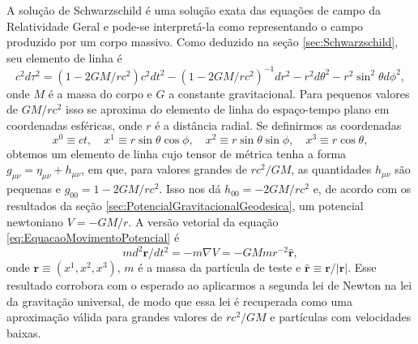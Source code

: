 A solução de Schwarzschild é uma solução exata das equações de campo da Relatividade Geral e pode-se interpretá-la como representando o campo produzido por um corpo massivo. Como deduzido na seção \ref{sec:Schwarzschild}, seu elemento de linha é
\[c^{2} d \tau^{2}=\left(1-2 G M / r c^{2}\right) c^{2} d t^{2}-\left(1-2 G M / r c^{2}\right)^{-1} d r^{2}-r^{2} d \theta^{2}-r^{2} \sin ^{2} \theta d \phi^{2},\]
onde $ M $ é a massa do corpo e $ G $ a constante gravitacional. Para pequenos valores de $ GM/rc^2 $ isso se aproxima do elemento de linha do espaço-tempo plano em coordenadas esféricas, onde $ r $ é a distância radial. Se definirmos as coordenadas
\[x^{0} \equiv c t, \quad x^{1} \equiv r \sin \theta \cos \phi, \quad x^{2} \equiv r \sin \theta \sin \phi, \quad x^{3} \equiv r \cos \theta,\]
obtemos um elemento de linha cujo tensor de métrica tenha a forma $ g_{\mu\nu} =\eta_{\mu \nu}+h_{\mu\nu} $, em que, para valores grandes de $ rc^2/GM $, as quantidades $ h_{\mu\nu} $ são pequenas e $ g_{00}=1-2GM/rc^2 $.  Isso nos dá $ h_{00} = -2GM/rc^2 $ e, de acordo com os resultados da seção \ref{sec:PotencialGravitacionalGeodesica}, um potencial newtoniano $ V = -GM/r $. A versão vetorial da equação \eqref{eq:EquacaoMovimentoPotencial} é 
\[
m d^{2} \mathbf{r} / d t^{2}=-m \nabla V=-G M m r^{-2} \hat{\mathbf{r}}
,\]
onde $ \mathbf{r} \equiv\left(x^{1}, x^{2}, x^{3}\right) $, $ m $ é a massa da partícula de teste e $ \hat{\mathbf{r}}\equiv \mathbf{r}/|\mathbf{r}| $. Esse resultado corrobora com o esperado ao aplicarmos a segunda lei de Newton na lei da gravitação universal, de modo que essa lei é recuperada como uma aproximação válida para grandes valores de $ rc^2/GM $ e partículas com velocidades baixas.



